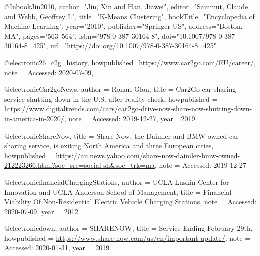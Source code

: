 @Inbook{Jin2010,
author="Jin, Xin
and Han, Jiawei",
editor="Sammut, Claude
and Webb, Geoffrey I.",
title="K-Means Clustering",
bookTitle="Encyclopedia of Machine Learning",
year="2010",
publisher="Springer US",
address="Boston, MA",
pages="563--564",
isbn="978-0-387-30164-8",
doi="10.1007/978-0-387-30164-8_425",
url="https://doi.org/10.1007/978-0-387-30164-8_425"
}



















@electronic{26_c2g_history,
  howpublished={\url{https://www.car2go.com/EU/career/}},
  note = {Accessed: 2020-07-09},
}












@electronic{Car2goNews,
  author = {Ronan Glon},
  title = {{Car2Go car-sharing service shutting down in the U.S. after reality check}},
  howpublished = {\url{https://www.digitaltrends.com/cars/car2go-drive-now-share-now-shutting-down-in-america-in-2020/}},
  note = {Accessed: 2019-12-27},
  year= {2019}
}

@electronic{ShareNow,
  title = {{Share Now, the Daimler and BMW-owned car sharing service, is exiting North America and three European cities}},
  howpublished = {\url{https://au.news.yahoo.com/share-now-daimler-bmw-owned-212223266.html?soc_src=social-sh&soc_trk=ma}},
  note = {Accessed: 2019-12-27}
}



@electronic{financialChargingStations,
author = {UCLA Luskin Center for Innovation and UCLA Anderson School of Management},
title = {Financial Viability Of Non-Residential Electric Vehicle Charging Stations},
  note = {Accessed: 2020-07-09},
year = {2012}
}







@electronic{down,
  author = {SHARENOW},
  title = {Service Ending February 29th},
  howpublished = {\url{https://www.share-now.com/us/en/important-update/}},
  note = {Accessed: 2020-01-31},
  year = {2019}
}